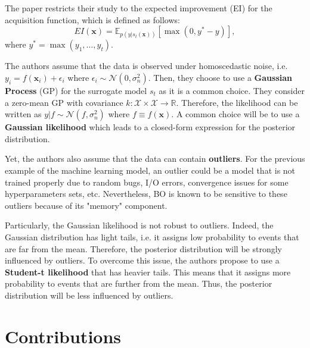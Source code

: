\documentclass{article}
\newcommand{\x}{\mathbf{x}}
\newcommand{\algoref}[1]{\hyperref[#1]{Algorithm~\ref{#1}}}
\newcommand{\cX}{\mathcal{X}}
\newcommand{\RR}{\mathbb{R}}
\begin{document}
The paper restricts their study to the expected improvement (EI) for the acquisition function, which is defined as follows:
\begin{equation}
	\label{eq:ei}
	EI(\x) = \mathbb{E}_{p(y|s_t(\x))} \left[\max(0,y^* - y)\right],
\end{equation}
where $y^*=\max(y_1,\ldots,y_t)$.

The authors assume that the data is observed under homoscedastic noise, i.e. $y_i = f(\x_i) + \epsilon_i$ where $\epsilon_i \sim \mathcal{N}(0, \sigma_n^2)$. Then, they choose to use a \textbf{Gaussian Process} (GP) for the surrogate model $s_t$ as it is a common choice. They consider a zero-mean GP with covariance $k : \cX \times \cX \rightarrow \RR$. Therefore, the likelihood can be written as $y | f \sim \mathcal{N}(f, \sigma_n^2)$ where $f \equiv f(\x)$. A common choice will be to use a \textbf{Gaussian likelihood} which leads to a closed-form expression for the posterior distribution.

Yet, the authors also assume that the data can contain \textbf{outliers}. For the previous example of the machine learning model, an outlier could be a model that is not trained properly due to random bugs, I/O errors, convergence issues for some hyperparameters sets, etc. Nevertheless, BO is known to be sensitive to these outliers because of its "memory" component.

Particularly, the Gaussian likelihood is not robust to outliers. Indeed, the Gaussian distribution has light tails, i.e. it assigns low probability to events that are far from the mean. Therefore, the posterior distribution will be strongly influenced by outliers. To overcome this issue, the authors propose to use a \textbf{Student-t likelihood} that has heavier tails. This means that it assigns more probability to events that are further from the mean. Thus, the posterior distribution will be less influenced by outliers.

\section{Contributions}

\end{document}
